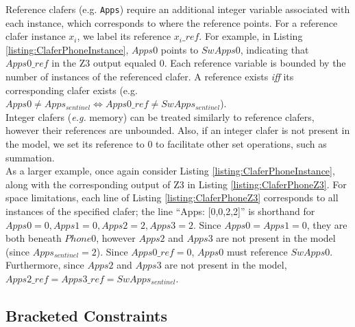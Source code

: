 \documentclass{article}
\newcommand{\eg}{\emph{e.g.}\xspace}
\begin{document}
\indent Reference clafers (e.g. \texttt{Apps}) require an additional integer variable associated with each instance, which corresponds to where the reference points. For a reference clafer instance $x_i$, we label its reference $x_i\_ref$. For example, in Listing \ref{listing:ClaferPhoneInstance}, $Apps0$ points to $SwApps0$, indicating that $Apps0\_ref$ in the Z3 output equaled 0. Each reference variable is bounded by the number of instances of the referenced clafer. A reference exists \textit{iff} its corresponding clafer exists (e.g. $Apps0 \ne Apps_{sentinel} \Leftrightarrow Apps0\_ref \ne SwApps_{sentinel}$). \\
\indent Integer clafers (\eg memory) can be treated similarly to reference clafers, however their references are unbounded. Also, if an integer clafer is not present in the model, we set its reference to 0 to facilitate other set operations, such as summation. \\
\indent As a larger example, once again consider Listing \ref{listing:ClaferPhoneInstance}, along with the corresponding output of Z3 in Listing \ref{listing:ClaferPhoneZ3}. For space limitations, each line of Listing \ref{listing:ClaferPhoneZ3} corresponds to all instances of the specified clafer; the line ``Apps: [0,0,2,2]'' is shorthand for $Apps0 = 0, Apps1 = 0, Apps2 = 2, Apps3 = 2$. Since $Apps0 = Apps1 = 0$, they are both beneath $Phone0$, however $Apps2$ and $Apps3$ are not present in the model (since $Apps_{sentinel} = 2$). Since $Apps0\_ref = 0$, $Apps0$ must reference $SwApps0$. Furthermore, since $Apps2$ and $Apps3$ are not present in the model, $Apps2\_ref = Apps3\_ref = SwApps_{sentinel}$.

\subsection{Bracketed Constraints}
\end{document}
